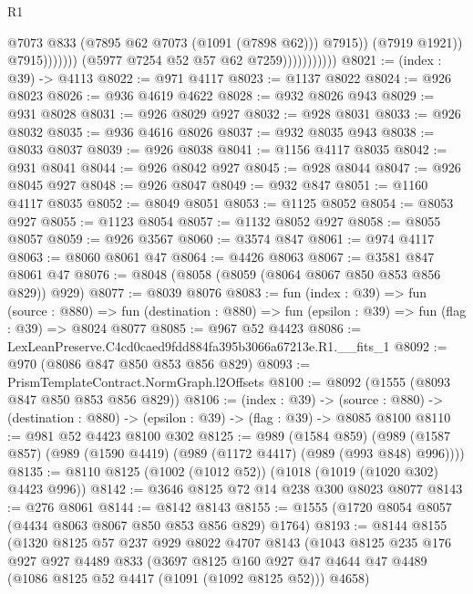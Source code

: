 \begin{lexlean}{R1}
\begin{coremodule}
                                            @7073
                                            @833
                                            (@7895 @62 @7073 (@1091 (@7898 @62)))
                                            @7915))
                                        (@7919 @1921))
                                      @7915)))))))
                        (@5977 @7254 @52 @57 @62 @7259)))))))))))
@8021 := (index : @39) -> @4113
@8022 := @971 @4117
@8023 := @1137 @8022
@8024 := @926 @8023
@8026 := @936 @4619 @4622
@8028 := @932 @8026 @943
@8029 := @931 @8028
@8031 := @926 @8029 @927
@8032 := @928 @8031
@8033 := @926 @8032
@8035 := @936 @4616 @8026
@8037 := @932 @8035 @943
@8038 := @8033 @8037
@8039 := @926 @8038
@8041 := @1156 @4117 @8035
@8042 := @931 @8041
@8044 := @926 @8042 @927
@8045 := @928 @8044
@8047 := @926 @8045 @927
@8048 := @926 @8047
@8049 := @932 @847
@8051 := @1160 @4117 @8035
@8052 := @8049 @8051
@8053 := @1125 @8052
@8054 := @8053 @927
@8055 := @1123 @8054
@8057 := @1132 @8052 @927
@8058 := @8055 @8057
@8059 := @926 @3567
@8060 := @3574 @847
@8061 := @974 @4117
@8063 := @8060 @8061 @47
@8064 := @4426 @8063
@8067 := @3581 @847 @8061 @47
@8076 := @8048 (@8058 (@8059 (@8064 @8067 @850 @853 @856 @829)) @929)
@8077 := @8039 @8076
@8083 := fun (index : @39) =>
  fun (source : @880) =>
  fun (destination : @880) => fun (epsilon : @39) => fun (flag : @39) => @8024 @8077
@8085 := @967 @52 @4423
@8086 := LexLeanPreserve.C4cd0caed9fdd884fa395b3066a67213e.R1.__fits_1
@8092 := @970 (@8086 @847 @850 @853 @856 @829)
@8093 := PrismTemplateContract.NormGraph.l2Offsets
@8100 := @8092 (@1555 (@8093 @847 @850 @853 @856 @829))
@8106 := (index : @39) ->
  (source : @880) -> (destination : @880) -> (epsilon : @39) -> (flag : @39) -> @8085 @8100
@8110 := @981 @52 @4423 @8100 @302
@8125 := @989
    (@1584 @859)
    (@989 (@1587 @857) (@989 (@1590 @4419) (@989 (@1172 @4417) (@989 (@993 @848) @996))))
@8135 := @8110 @8125 (@1002 (@1012 @52)) (@1018 (@1019 (@1020 @302) @4423 @996))
@8142 := @3646 @8125 @72 @14 @238 @300 @8023 @8077
@8143 := @276 @8061
@8144 := @8142 @8143
@8155 := @1555 (@1720 @8054 @8057 (@4434 @8063 @8067 @850 @853 @856 @829) @1764)
@8193 := @8144
    @8155
    (@1320
      @8125
      @57
      @237
      @929
      @8022
      @4707
      @8143
      (@1043
        @8125
        @235
        @176
        @927
        @927
        @4489
        @833
        (@3697
          @8125
          @160
          @927
          @47
          @4644
          @47
          @4489
          (@1086 @8125 @52 @4417 (@1091 (@1092 @8125 @52)))
          @4658)

\end{coremodule}
\end{lexlean}
